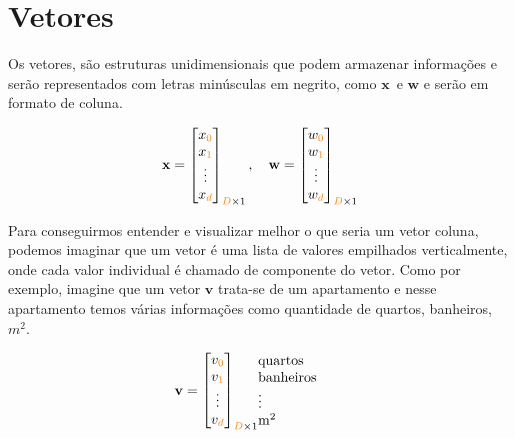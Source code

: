\section{Vetores}

Os vetores, são estruturas unidimensionais que podem armazenar informações e serão representados com letras minúsculas em negrito, como $\mathbf{x}$\ e $\mathbf{w}$ e serão 
em formato de coluna. 

\begin{equation}
\begin{aligned}
\mathbf{x} = 
\begin{bmatrix}
    x_{\mathcolor{orange}{0}} \\
    x_{\mathcolor{orange}{1}} \\
    \vdots \\
    x_{\mathcolor{orange}{d}}
\end{bmatrix}_{\mathcolor{orange}{D}\times 1}, \quad
\mathbf{w} = 
\begin{bmatrix}
    w_{\mathcolor{orange}{0}} \\
    w_{\mathcolor{orange}{1}} \\
    \vdots \\
    w_{\mathcolor{orange}{d}}
\end{bmatrix}_{\mathcolor{orange}{D}\times 1} 
\end{aligned}
\end{equation}

Para conseguirmos entender e visualizar melhor o que seria um vetor coluna, podemos imaginar que um vetor é uma lista de valores empilhados verticalmente, onde cada valor individual é chamado de componente do vetor.
Como por exemplo, imagine que um vetor $\mathbf{v}$ trata-se de um apartamento e nesse apartamento temos várias informações
como quantidade de quartos, banheiros, $m^2$.


\begin{equation}
    \mathbf{v} =
    \begin{array}{@{}c@{\qquad}l@{}}
        \vcenter{\hbox{$\begin{bmatrix}
            v_{\mathcolor{orange}{0}} \\
            v_{\mathcolor{orange}{1}} \\
            \vdots \\
            v_{\mathcolor{orange}{d}}
        \end{bmatrix}_{\mathcolor{orange}{D}\times 1}$}}
        \begin{array}{@{}l@{}}
            \text{quartos} \\
            \text{banheiros} \\
            \vdots \\
            \mathrm{m}^2
        \end{array}
    \end{array}
\end{equation}
